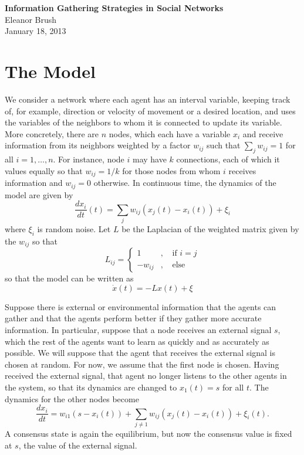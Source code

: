 \documentclass{article}
\begin{document}
\begin{center}
{\bf \LARGE{Information Gathering Strategies in Social Networks}}
\vspace{10pt}
\\ Eleanor Brush
\\ January 18, 2013
\end{center}

\tableofcontents


\section{The Model}

We consider a network where each agent has an interval variable, keeping track of, for example, direction or velocity of movement or a desired location, and uses the variables of the neighbors to whom it is connected to update its variable.  More concretely, there are $n$ nodes, which each have a variable $x_i$ and receive information from its neighbors weighted by a factor $w_{ij}$ such that $\sum_jw_{ij}=1$ for all $i=1,\dots,n$.  For instance, node $i$ may have $k$ connections, each of which it values equally so that $w_{ij}=1/k$ for those nodes from whom $i$ receives information and $w_{ij}=0$ otherwise.  In continuous time, the dynamics of the model are given by
$$\frac{d x_i}{dt}(t)=\sum_jw_{ij}(x_j(t)-x_i(t))+\xi_i$$ 
where $\xi_i$ is random noise.  Let $L$ be the Laplacian of the weighted matrix given by the $w_{ij}$ so that
$$L_{ij}=\left\{\begin{array}{cccc}
1& , & \text{ if } i=j \\
-w_{ij} & , & \text{ else}
\end{array}\right.$$
so that the model can be written as 
$$\dot{x}(t)=-Lx(t)+\xi$$

Suppose there is external or environmental information that the agents can gather and that the agents perform better if they gather more accurate information.  In particular, suppose that a node receives an external signal $s$, which the rest of the agents want to learn as quickly and as accurately as possible.  We will suppose that the agent that receives the external signal is chosen at random.  For now, we assume that the first node is chosen.   Having received the external signal, that agent no longer listens to the other agents in the system, so that its dynamics are changed to $x_1(t)=s$ for all $t$.   The dynamics for the other nodes become
$$\frac{dx_i}{dt}=w_{i1}(s-x_i(t))+\sum_{j\neq 1}w_{ij}(x_j(t)-x_i(t))+\xi_i(t).$$
A consensus state is again the equilibrium, but now the consensus value is fixed at $s$, the value of the external signal.  
\end{document}
